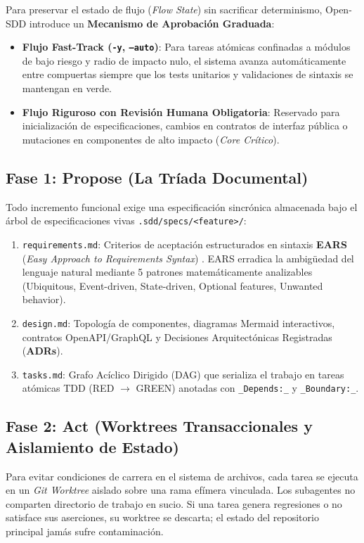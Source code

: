 \documentclass[11pt,a4paper]{article}
\begin{document}
Para preservar el estado de flujo (\textit{Flow State}) sin sacrificar determinismo, Open-SDD introduce un \textbf{Mecanismo de Aprobación Graduada}:
\begin{itemize}
    \item \textbf{Flujo Fast-Track (\texttt{-y}, \texttt{--auto})}: Para tareas atómicas confinadas a módulos de bajo riesgo y radio de impacto nulo, el sistema avanza automáticamente entre compuertas siempre que los tests unitarios y validaciones de sintaxis se mantengan en verde.
    \item \textbf{Flujo Riguroso con Revisión Humana Obligatoria}: Reservado para inicialización de especificaciones, cambios en contratos de interfaz pública o mutaciones en componentes de alto impacto (\textit{Core Crítico}).
\end{itemize}

\subsection{Fase 1: Propose (La Tríada Documental)}
Todo incremento funcional exige una especificación sincrónica almacenada bajo el árbol de especificaciones vivas \texttt{.sdd/specs/<feature>/}:
\begin{enumerate}
    \item \texttt{requirements.md}: Criterios de aceptación estructurados en sintaxis \textbf{EARS} (\textit{Easy Approach to Requirements Syntax}) \cite{mavin2009ears}. EARS erradica la ambigüedad del lenguaje natural mediante 5 patrones matemáticamente analizables (Ubiquitous, Event-driven, State-driven, Optional features, Unwanted behavior).
    \item \texttt{design.md}: Topología de componentes, diagramas Mermaid interactivos, contratos OpenAPI/GraphQL y Decisiones Arquitectónicas Registradas (\textbf{ADRs}).
    \item \texttt{tasks.md}: Grafo Acíclico Dirigido (DAG) que serializa el trabajo en tareas atómicas TDD (RED $\to$ GREEN) anotadas con \texttt{\_Depends:\_} y \texttt{\_Boundary:\_}.
\end{enumerate}

\subsection{Fase 2: Act (Worktrees Transaccionales y Aislamiento de Estado)}
Para evitar condiciones de carrera en el sistema de archivos, cada tarea se ejecuta en un \textit{Git Worktree} aislado sobre una rama efímera vinculada. Los subagentes no comparten directorio de trabajo en sucio. Si una tarea genera regresiones o no satisface sus aserciones, su worktree se descarta; el estado del repositorio principal jamás sufre contaminación.
\end{document}
